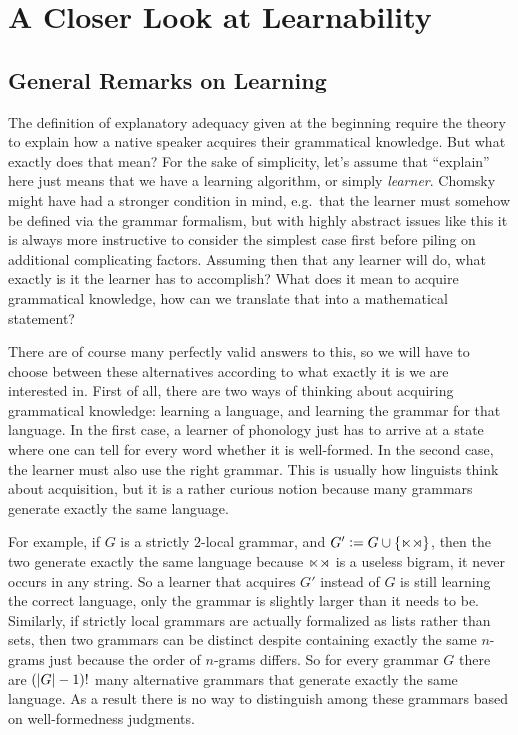 \section{A Closer Look at Learnability}

\subsection{General Remarks on Learning}

The definition of explanatory adequacy given at the beginning require the theory to explain how a native speaker acquires their grammatical knowledge.
But what exactly does that mean?
For the sake of simplicity, let's assume that ``explain'' here just means that we have a learning algorithm, or simply \emph{learner}.
Chomsky might have had a stronger condition in mind, e.g.\ that the learner must somehow be defined via the grammar formalism, but with highly abstract issues like this it is always more instructive to consider the simplest case first before piling on additional complicating factors.
Assuming then that any learner will do, what exactly is it the learner has to accomplish?
What does it mean to acquire grammatical knowledge, how can we translate that into a mathematical statement?

There are of course many perfectly valid answers to this, so we will have to choose between these alternatives according to what exactly it is we are interested in.
First of all, there are two ways of thinking about acquiring grammatical knowledge: learning a language, and learning the grammar for that language.
In the first case, a learner of phonology just has to arrive at a state where one can tell for every word whether it is well-formed.
In the second case, the learner must also use the right grammar.
This is usually how linguists think about acquisition, but it is a rather curious notion because many grammars generate exactly the same language.

For example, if $G$ is a strictly $2$-local grammar, and $G' \mathrel{\mathop:}= G \cup \left \{ \ltimes \rtimes \right \}$, then the two generate exactly the same language because $\ltimes\rtimes$ is a useless bigram, it never occurs in any string.
So a learner that acquires $G'$ instead of $G$ is still learning the correct language, only the grammar is slightly larger than it needs to be.
Similarly, if strictly local grammars are actually formalized as lists rather than sets, then two grammars can be distinct despite containing exactly the same $n$-grams just because the order of $n$-grams differs.
So for every grammar $G$ there are $(| G |-1)!$ many alternative grammars that generate exactly the same language.
As a result there is no way to distinguish among these grammars based on well-formedness judgments.

